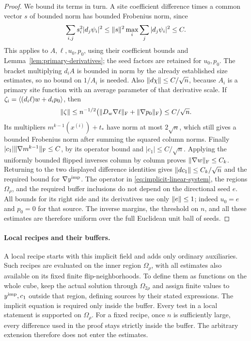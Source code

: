 \begin{proof}
We bound its terms in turn.  A site coefficient difference
times a common vector $s$ of bounded norm has bounded Frobenius norm,
since
\[
 \sum_{i,j}s_i^2|d_j\psi_i|^2
 \leq \lVert s\rVert^2\max_i\sum_j|d_j\psi_i|^2\leq C.
\]
This applies to $A,\ell,u_0,p_0$, using their coefficient bounds and
Lemma~\ref{lem:primary-derivatives}; the seed factors are retained for
$u_0,p_0$.  The bracket multiplying $d_iA$ is bounded in norm by the
already established size estimates, so no bound on $1/A_i$ is needed.
Also $\lVert d\chi\rVert\leq C/\sqrt n$, because $A_i$ is a primary site
function with an average parameter of that derivative scale.  If
$\zeta_i=\langle (d_i\ell)w+d_i p_0\rangle$, then
\[
 \lVert \zeta\rVert\leq n^{-1/2}
   \bigl(\lVert D_w\nabla\ell\rVert_{\mathrm F}
                      +\lVert \nabla p_0\rVert_{\mathrm F}\bigr)
 \leq C/\sqrt n.
\]
Its multipliers $m^{k-1}(x^{(i)})+t_*$ have norm at most $2\sqrt n$,
which still gives a bounded Frobenius norm after summing the squared
column norms.  Finally
$|c_1|\lVert \nabla m^{k-1}\rVert_{\mathrm F}\leq C$, by its operator bound and
$|c_1|\leq C/\sqrt n$.  Applying the uniformly bounded flipped inverses
column by column proves $\lVert \nabla w\rVert_{\mathrm F}\leq C_k$.
Returning to the two displayed difference identities gives
$\lVert dc_1\rVert\leq C_k/\sqrt n$ and the required bound for
$\nabla y^{\rm imp}$.
The operator in \eqref{eq:implicit-linear-system}, the regions
$\Omega_\rho$, and the required buffer inclusions do not depend on the
directional seed $e$.  All bounds for its right side and its derivatives
use only $\lVert e\rVert\leq1$; indeed $u_0=e$ and $p_0=0$ for that source.
The inverse margins, the threshold on $n$, and all these estimates are
therefore uniform over the full Euclidean unit ball of seeds.
\end{proof}

\paragraph{Local recipes and their buffers.}
A local recipe starts with this implicit field and adds only ordinary
auxiliaries. Such
recipes are evaluated on the inner
region $\Omega_\rho$, with all estimates also available on its fixed
finite flip-neighborhoods.  To define them as functions on the whole cube,
keep the actual solution through $\Omega_{2\rho}$ and assign finite values
to $y^{\rm imp},c_1$ outside that region, defining sources by their stated
expressions. The implicit equation is required only inside the buffer.
Every test
in a local statement is supported on $\Omega_\rho$. For a fixed recipe,
once $n$ is sufficiently large, every difference used in the proof stays
strictly inside the buffer. The arbitrary extension therefore does not
enter the estimates.

